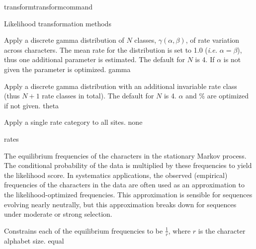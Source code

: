 \begin{command}{transform}{transformcommand}
\begin{arguments}
\begin{argumentgroup}{Likelihood transformation methods}
{                \begin{description}

                        {Apply a discrete gamma distribution of $N$ classes,
                        $\gamma(\alpha,\beta)$, of rate variation across
                        characters. The mean rate for the distribution is set to
                        1.0 (\emph{i.e.} $\alpha = \beta$), thus one additional parameter is
                        estimated. The default for $N$ is 4. If $\alpha$ is
                        not given the parameter is optimized.}
                        {gamma}

                        {Apply a discrete gamma distribution with an additional
                        invariable rate class (thus $N+1$ rate classes in total).
                        The default for $N$ is 4. $\alpha$ and \% are optimized if
                        not given.}
                        {theta}

                        {Apply a single rate category to all sites.}
                        {none}

                \end{description}}
                {rates}

                    {The equilibrium frequencies of the characters in the stationary
                    Markov process. The conditional probability of the data is
                    multiplied by these frequencies to yield the likelihood score.
                    In systematics applications, the observed (empirical)
                    frequencies of the characters in the data are often used as an
                    approximation to the likelihood-optimized frequencies. This
                    approximation is sensible for sequences evolving nearly
                    neutrally, but this approximation breaks down for sequences
                    under moderate or strong selection.

                    \begin{description}

                            {Constrains each of the equilibrium frequencies to be
                            $\frac{1}{r}$, where $r$ is the character alphabet size.}
                            {equal}


\end{description}}
\end{argumentgroup}
\end{arguments}
\end{command}
